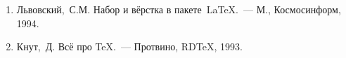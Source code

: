 \begin{enumerate}%

\item\label{r8} Львовский,~С.М. Набор и вёрстка в пакете~\LaTeX.~---
М., Космосинформ, 1994.

\item\label{r1} Кнут,~Д. Всё про \TeX.~--- Протвино, RD\TeX, 1993.

\end{enumerate}%


\label{pages_total}%



